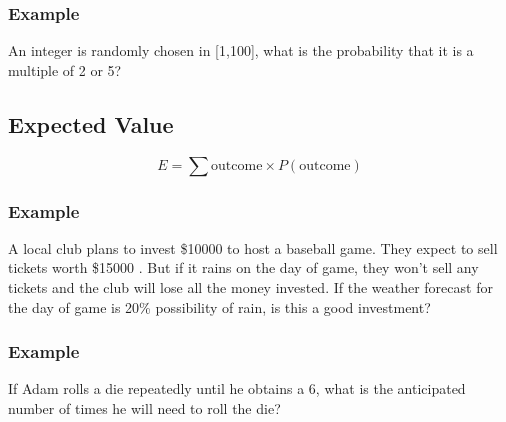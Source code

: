 \documentclass{article}
\begin{document}
\subsubsection{Example}
An integer is randomly chosen in [1,100],  what is the probability that it is a multiple of 2 or 5?
\vspace{30px}
\pagebreak
\subsection{Expected Value}
$$E = \sum \text{outcome}\times P(\text{outcome})$$
\subsubsection{Example}
A local club plans to invest \$10000 to host a baseball game. They expect to sell tickets worth \$15000 . But if it rains on the day of game, they won't sell any tickets and the club will lose all the money invested. If the weather forecast for the day of game is 20\% possibility of rain, is this a good investment?
\vspace{50px}
\subsubsection{Example}
If Adam rolls a die repeatedly until he obtains a 6, what is the anticipated number of times he will need to roll the die?
\end{document}

